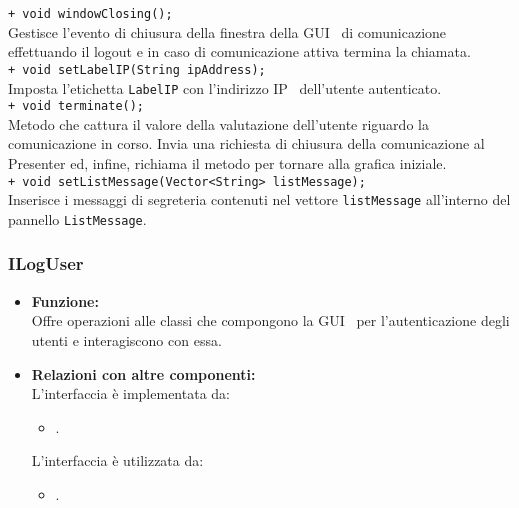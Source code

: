 {\begin{sloppypar}
{{\begin{itemize}
					\texttt{+ void windowClosing();}\\
					Gestisce l'evento di chiusura della finestra della GUI\g~ di comunicazione effettuando il logout e in caso di comunicazione attiva termina la chiamata.\\
					
					\texttt{+ void setLabelIP(String ipAddress);}\\
					Imposta l'etichetta \texttt{LabelIP} con l'indirizzo IP\g~ dell'utente autenticato.\\
					
					\texttt{+ void terminate();}\\
					Metodo che cattura il valore della valutazione dell'utente riguardo la comunicazione in corso. Invia una richiesta di chiusura della comunicazione al Presenter ed, infine, richiama il metodo per tornare alla grafica iniziale.\\
					
					\texttt{+ void setListMessage(Vector<String> listMessage);}\\
					Inserisce i messaggi di segreteria contenuti nel vettore \texttt{listMessage} all'interno del pannello 
					\texttt{ListMessage}.\\
		\end{itemize}			
		}
		
		
\subsubsection{ILogUser}\label{ssub:ILogUser}{
		\begin{itemize}

			\item[] \textbf{Funzione:}\\
				Offre operazioni alle classi che compongono la GUI\g~ per l'autenticazione degli utenti e interagiscono con essa.\\

			\item[] \textbf{Relazioni con altre componenti:}\\
				L'interfaccia è implementata da:
				\begin{itemize}
					\item[] .
				\end{itemize}
				L'interfaccia è utilizzata da:
				\begin{itemize}
					\item[] .\\
				\end{itemize}


\end{itemize}}}
\end{sloppypar}}
